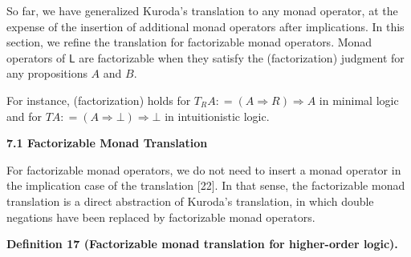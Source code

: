 \documentclass[10pt,a4paper]{article}
\begin{document}
 
So far, we have generalized Kuroda’s translation to any monad operator, at the expense of the insertion of additional monad operators after implications. In this section, we refine the translation for factorizable monad operators. Monad operators of $\mathsf{L}$ are factorizable when they satisfy the (factorization) judgment for any propositions $A$ and $B$.\par
 
\begin{center}\end{center}
 
For instance, (factorization) holds for $T_{R}A\mathrel{\mathop{:}}=(A\mathbin{\Rightarrow}R)\mathbin{\Rightarrow}A$ in minimal logic and for $TA\mathrel{\mathop{:}}=(A\mathbin{\Rightarrow}\bot)\mathbin{\Rightarrow}\bot$ in intuitionistic logic.\par
 
 
 
\par\medskip\noindent\textbf{7.1 Factorizable Monad Translation}\par
 
 
For factorizable monad operators, we do not need to insert a monad operator in the implication case of the translation [22]. In that sense, the factorizable monad translation is a direct abstraction of Kuroda’s translation, in which double negations have been replaced by factorizable monad operators.\par
 
 
 
\par\medskip\noindent\textbf{Definition 17 (Factorizable monad translation for higher-order logic).}\par
 
 
\end{document}
